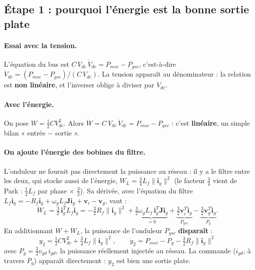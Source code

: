 \documentclass[11pt,a4paper]{article}
\newcommand{\bv}[1]{\boldsymbol{#1}}
\begin{document}
\subsection{Étape 1 : pourquoi l'énergie est la bonne sortie plate}
\paragraph{Essai avec la tension.} L'équation du bus est
$C\,V_{dc}\,\dot V_{dc} = P_{msc} - P_{gsc}$, c'est-à-dire $\dot V_{dc} = (P_{msc}-P_{gsc})/(C\,V_{dc})$.
La tension apparaît au dénominateur : la relation est \textbf{non linéaire}, et l'inverser oblige à diviser
par $V_{dc}$.

\paragraph{Avec l'énergie.} On pose $W = \tfrac12 C V_{dc}^2$. Alors
$\dot W = C\,V_{dc}\,\dot V_{dc} = P_{msc} - P_{gsc}$ : c'est \textbf{linéaire}, un simple bilan
« entrée $-$ sortie ».

\paragraph{On ajoute l'énergie des bobines du filtre.} L'onduleur ne fournit pas directement la puissance
au réseau : il y a le filtre entre les deux, qui stocke aussi de l'énergie,
$W_L = \tfrac34 L_f\|\bv{i}_g\|^2$ (le facteur $\tfrac34$ vient de Park : $\tfrac12 L_f$ par phase $\times$
$\tfrac32$). Sa dérivée, avec l'équation du filtre
$L_f\dot{\bv{i}}_g = -R_f\bv{i}_g + \omega_g L_f\mathbf{J}\bv{i}_g + \bv{v}_i - \bv{v}_g$, vaut :
\begin{equation}
\dot W_L = \tfrac32\,\bv{i}_g^T L_f\dot{\bv{i}}_g
= -\tfrac32 R_f\|\bv{i}_g\|^2 + \underbrace{\tfrac32\omega_g L_f\,\bv{i}_g^T\mathbf{J}\bv{i}_g}_{=0}
+ \underbrace{\tfrac32\bv{v}_i^T\bv{i}_g}_{P_{gsc}} - \underbrace{\tfrac32\bv{v}_g^T\bv{i}_g}_{P_g}.
\end{equation}
En additionnant $\dot W + \dot W_L$, la puissance de l'onduleur $P_{gsc}$ \textbf{disparaît} :
\begin{equation}
\boxed{y_2 = \tfrac12 C V_{dc}^2 + \tfrac34 L_f\|\bv{i}_g\|^2, \qquad
\dot y_2 = P_{msc} - P_g - \tfrac32 R_f\|\bv{i}_g\|^2}
\end{equation}
avec $P_g = \tfrac32 v_{gd}\, i_{gd}$, la puissance réellement injectée au réseau. La commande
($i_{gd}$, à travers $P_g$) apparaît directement : $y_2$ est bien une sortie plate.
\end{document}
